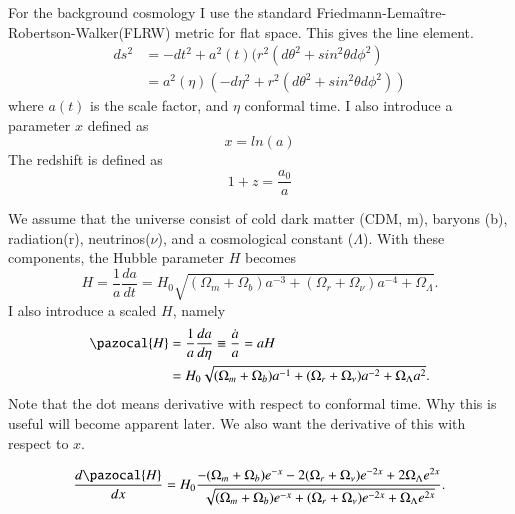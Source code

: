 \documentclass{aa}   %
\begin{document}
For the background cosmology I use the standard Friedmann-Lemaître-Robertson-Walker(FLRW) metric for flat space.
This gives the line element.
\begin{equation}\label{FLRW}
\begin{aligned}
ds^2 &= -dt^2 +a^2(t)(r^2(d\theta^2+sin^2\theta d\phi^2)\\
     &=a^2(\eta)(-d\eta^2 +r^2(d\theta^2+sin^2\theta d\phi^2))
\end{aligned}
\end{equation}
where $a(t)$ is the scale factor, and $\eta$ conformal time.
I also introduce a parameter $x$ defined as 
\begin{equation}\label{xeq}
 x = ln(a)
\end{equation}
The redshift is defined as
\begin{equation}
 1+ z =\frac{a_0}{a}
\end{equation}

We assume that the universe consist of cold dark matter (CDM, m), baryons (b), radiation(r), neutrinos($\nu$), and a cosmological constant ($\Lambda$). 
With these components, the Hubble parameter $H$ becomes
\begin{equation}
 H = \frac{1}{a}\frac{da}{dt} = H_0\sqrt{(\Omega_m+\Omega_b)a^{-3}+(\Omega_r+\Omega_\nu)a^{-4}+\Omega_\Lambda}.
\end{equation}
I also introduce a scaled $H$, namely
\begin{equation}
\begin{aligned}
\pazocal{H} &= \frac{1}{a}\frac{da}{d\eta} \equiv \frac{\dot{a}}{a} = aH\\
&=H_0\sqrt{(\Omega_m+\Omega_b)a^{-1}+(\Omega_r+\Omega_\nu)a^{-2}+\Omega_\Lambda a^2}.
\end{aligned}
\end{equation}
Note that the dot means derivative with respect to conformal time. Why this is useful will become apparent later.
We also want the derivative of this with respect to $x$.

\begin{equation}
 \frac{d\pazocal{H}}{dx} = H_0\frac{-(\Omega_m+\Omega_b)e^{-x}-2(\Omega_r+\Omega_\nu)e^{-2x}+2\Omega_\Lambda e^{2x}}{\sqrt{(\Omega_m+\Omega_b)e^{-x}+(\Omega_r+\Omega_\nu)e^{-2x}+\Omega_\Lambda e^{2x}}}.
\end{equation}
\end{document}
